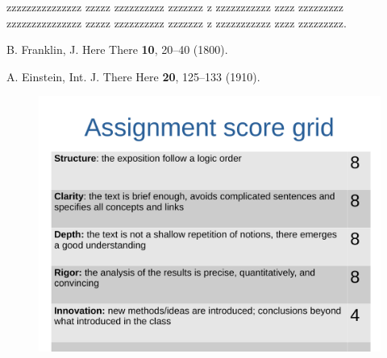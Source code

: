 \documentclass[prl,twocolumn]{revtex4-1}
\begin{document}
  zzzzzzzzzzzzzzz zzzzz zzzzzzzzzz zzzzzzz z zzzzzzzzzzz zzzz zzzzzzzzz
  zzzzzzzzzzzzzzz zzzzz zzzzzzzzzz zzzzzzz z zzzzzzzzzzz zzzz zzzzzzzzz.

  





\begin{thebibliography}{99}

  B. Franklin,
  J. Here There {\bf 10}, 20--40 (1800).
  
  A. Einstein,
  Int. J. There Here {\bf 20}, 125--133 (1910).
  
\end{thebibliography}

\clearpage

\begin{figure}[!tb]
  \centering
  \includegraphics[width=\textwidth]{description_assignment_LCPB_20-21.pdf}
\end{figure}
\end{document}
